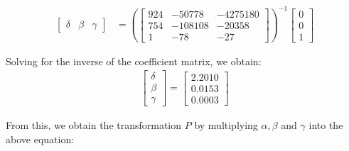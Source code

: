 \documentclass[12pt, oneside]{article}
\begin{document}
  \begin{align*}
  \begin{bmatrix} \delta & \beta & \gamma \end{bmatrix}  
  &= \left(\begin{bmatrix}
    924 & -50778    & -4275180   \\
    754 & -108108     & -20358\\
    1   & -78       & -27
  \end{bmatrix} \right) ^{-1}
  \begin{bmatrix}
  0  \\
  0   \\
  1  
  \end{bmatrix}
  \end{align*} 
  
  Solving for the inverse of the coefficient matrix, we obtain:
  \begin{align*}
  \begin{bmatrix} \delta \\ \beta \\ \gamma \end{bmatrix} = 
  \begin{bmatrix} 2.2010    \\  0.0153   \\ 0.0003  \end{bmatrix} 
  \end{align*}
    
From this, we obtain the transformation $P$ by multiplying $\alpha, \beta$ 
  and $\gamma$ into the above equation:
  
\end{document}
